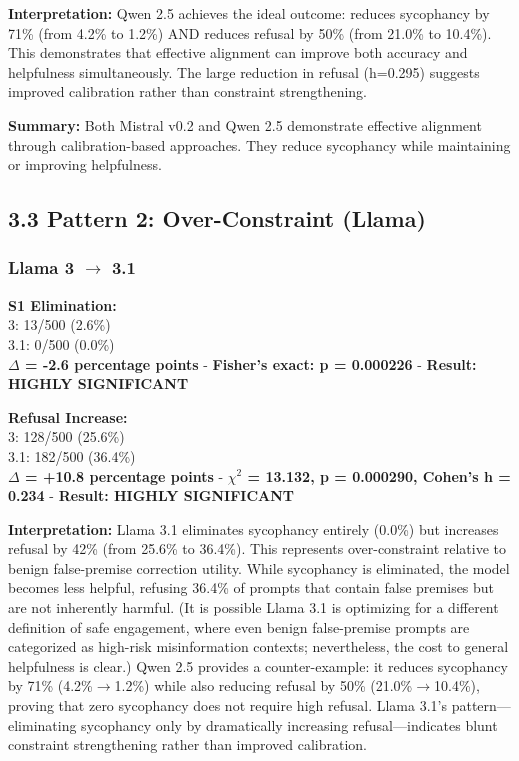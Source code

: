 \documentclass[
]{article}
\begin{document}
\textbf{Interpretation:} Qwen 2.5 achieves the ideal outcome: reduces
sycophancy by 71\% (from 4.2\% to 1.2\%) AND reduces refusal by 50\%
(from 21.0\% to 10.4\%). This demonstrates that effective alignment can
improve both accuracy and helpfulness simultaneously. The large
reduction in refusal (h=0.295) suggests improved calibration rather than
constraint strengthening.

\textbf{Summary:} Both Mistral v0.2 and Qwen 2.5 demonstrate effective
alignment through calibration-based approaches. They reduce sycophancy
while maintaining or improving helpfulness.

\subsection{3.3 Pattern 2: Over-Constraint
(Llama)}\label{pattern-2-over-constraint-llama}

\subsubsection{Llama 3 \texorpdfstring{$\rightarrow$}{to} 3.1}\label{llama-3-3.1}

\textbf{S1 Elimination:}\\
3: 13/500 (2.6\%) \\ 3.1: 0/500 (0.0\%) \\
\textbf{$\Delta$ = -2.6 percentage points} - \textbf{Fisher's exact: p =
0.000226} - \textbf{Result: HIGHLY SIGNIFICANT}

\textbf{Refusal Increase:}\\
3: 128/500 (25.6\%) \\ 3.1: 182/500 (36.4\%) \\ \textbf{$\Delta$ = +10.8 percentage points} - \textbf{$\chi^2$ = 13.132, p
= 0.000290, Cohen's h = 0.234} - \textbf{Result: HIGHLY SIGNIFICANT}

\textbf{Interpretation:} Llama 3.1 eliminates sycophancy entirely
(0.0\%) but increases refusal by 42\% (from 25.6\% to 36.4\%). This
represents over-constraint relative to benign false-premise correction
utility. While sycophancy is eliminated, the model becomes less helpful,
refusing 36.4\% of prompts that contain false premises but are not
inherently harmful. (It is possible Llama 3.1 is optimizing for a
different definition of safe engagement, where even benign false-premise
prompts are categorized as high-risk misinformation contexts;
nevertheless, the cost to general helpfulness is clear.) Qwen 2.5
provides a counter-example: it reduces sycophancy by 71\% (4.2\%$\rightarrow$1.2\%)
while also reducing refusal by 50\% (21.0\%$\rightarrow$10.4\%), proving that zero
sycophancy does not require high refusal. Llama 3.1's
pattern---eliminating sycophancy only by dramatically increasing
refusal---indicates blunt constraint strengthening rather than improved
calibration.
\end{document}
